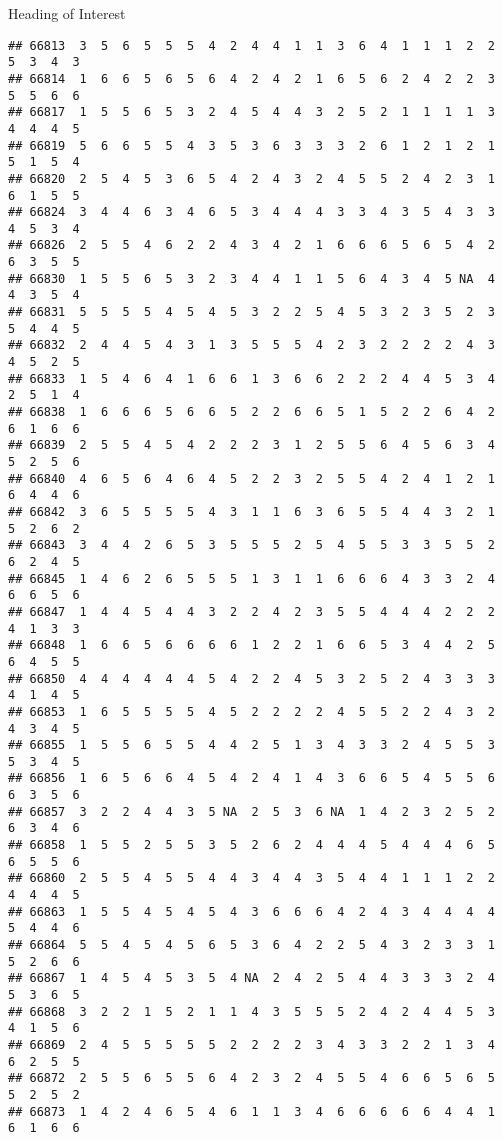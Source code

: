 \documentclass[
  ignorenonframetext,
]{beamer}
\begin{document}
\begin{frame}[fragile]{Heading of Interest}
\begin{verbatim}
## 66813  3  5  6  5  5  5  4  2  4  4  1  1  3  6  4  1  1  1  2  2  5  3  4  3
## 66814  1  6  6  5  6  5  6  4  2  4  2  1  6  5  6  2  4  2  2  3  5  5  6  6
## 66817  1  5  5  6  5  3  2  4  5  4  4  3  2  5  2  1  1  1  1  3  4  4  4  5
## 66819  5  6  6  5  5  4  3  5  3  6  3  3  3  2  6  1  2  1  2  1  5  1  5  4
## 66820  2  5  4  5  3  6  5  4  2  4  3  2  4  5  5  2  4  2  3  1  6  1  5  5
## 66824  3  4  4  6  3  4  6  5  3  4  4  4  3  3  4  3  5  4  3  3  4  5  3  4
## 66826  2  5  5  4  6  2  2  4  3  4  2  1  6  6  6  5  6  5  4  2  6  3  5  5
## 66830  1  5  5  6  5  3  2  3  4  4  1  1  5  6  4  3  4  5 NA  4  4  3  5  4
## 66831  5  5  5  5  4  5  4  5  3  2  2  5  4  5  3  2  3  5  2  3  5  4  4  5
## 66832  2  4  4  5  4  3  1  3  5  5  5  4  2  3  2  2  2  2  4  3  4  5  2  5
## 66833  1  5  4  6  4  1  6  6  1  3  6  6  2  2  2  4  4  5  3  4  2  5  1  4
## 66838  1  6  6  6  5  6  6  5  2  2  6  6  5  1  5  2  2  6  4  2  6  1  6  6
## 66839  2  5  5  4  5  4  2  2  2  3  1  2  5  5  6  4  5  6  3  4  5  2  5  6
## 66840  4  6  5  6  4  6  4  5  2  2  3  2  5  5  4  2  4  1  2  1  6  4  4  6
## 66842  3  6  5  5  5  5  4  3  1  1  6  3  6  5  5  4  4  3  2  1  5  2  6  2
## 66843  3  4  4  2  6  5  3  5  5  5  2  5  4  5  5  3  3  5  5  2  6  2  4  5
## 66845  1  4  6  2  6  5  5  5  1  3  1  1  6  6  6  4  3  3  2  4  6  6  5  6
## 66847  1  4  4  5  4  4  3  2  2  4  2  3  5  5  4  4  4  2  2  2  4  1  3  3
## 66848  1  6  6  5  6  6  6  6  1  2  2  1  6  6  5  3  4  4  2  5  6  4  5  5
## 66850  4  4  4  4  4  4  5  4  2  2  4  5  3  2  5  2  4  3  3  3  4  1  4  5
## 66853  1  6  5  5  5  5  4  5  2  2  2  2  4  5  5  2  2  4  3  2  4  3  4  5
## 66855  1  5  5  6  5  5  4  4  2  5  1  3  4  3  3  2  4  5  5  3  5  3  4  5
## 66856  1  6  5  6  6  4  5  4  2  4  1  4  3  6  6  5  4  5  5  6  6  3  5  6
## 66857  3  2  2  4  4  3  5 NA  2  5  3  6 NA  1  4  2  3  2  5  2  6  3  4  6
## 66858  1  5  5  2  5  5  3  5  2  6  2  4  4  4  5  4  4  4  6  5  6  5  5  6
## 66860  2  5  5  4  5  5  4  4  3  4  4  3  5  4  4  1  1  1  2  2  4  4  4  5
## 66863  1  5  5  4  5  4  5  4  3  6  6  6  4  2  4  3  4  4  4  4  5  4  4  6
## 66864  5  5  4  5  4  5  6  5  3  6  4  2  2  5  4  3  2  3  3  1  5  2  6  6
## 66867  1  4  5  4  5  3  5  4 NA  2  4  2  5  4  4  3  3  3  2  4  5  3  6  5
## 66868  3  2  2  1  5  2  1  1  4  3  5  5  5  2  4  2  4  4  5  3  4  1  5  6
## 66869  2  4  5  5  5  5  5  2  2  2  2  3  4  3  3  2  2  1  3  4  6  2  5  5
## 66872  2  5  5  6  5  5  6  4  2  3  2  4  5  5  4  6  6  5  6  5  5  2  5  2
## 66873  1  4  2  4  6  5  4  6  1  1  3  4  6  6  6  6  6  4  4  1  6  1  6  6

\end{verbatim}
\end{frame}
\end{document}
